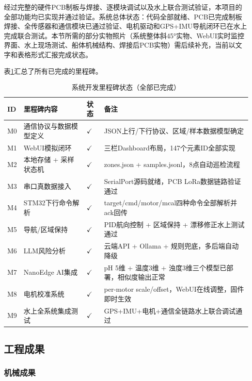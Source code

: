 \documentclass[12pt,a4paper]{ctexart}
\begin{document}
经过完整的硬件PCB制板与焊接、逐模块调试以及水上联合测试验证，本项目的全部功能均已实现并通过验证。系统总体状态：代码全部就绪、PCB已完成制板焊接、全传感器和通信模块已通过验证、电机驱动和GPS+IMU导航闭环已在水上完成联合测试。本节所需的部分实物照片（系统整体斜45°实物、WebUI实时监控界面、水上现场测试、船体机械结构、焊接后PCB实物）需后续补充，当前以文字和表格形式汇报完成状态。

表\ref{tab:milestones}汇总了所有已完成的里程碑。

\begin{table}[H]
\centering
\caption{系统开发里程碑状态（全部已完成）}
\label{tab:milestones}
\begin{tabular}{p{0.8cm}p{5.5cm}p{2cm}p{4.5cm}}
\toprule
\textbf{ID} & \textbf{里程碑内容} & \textbf{状态} & \textbf{备注} \\
\midrule
M0 & 通信协议与数据模型定义 & $\checkmark$ & JSON上行/下行协议、区域/样本数据模型确定 \\
M1 & WebUI模拟闭环 & $\checkmark$ & 三栏Dashboard布局，147个元素ID全部实现 \\
M2 & 本地存储 + 采样状态机 & $\checkmark$ & zones.json + samples.jsonl，8点自动巡检流程 \\
M3 & 串口真数据接入 & $\checkmark$ & SerialPort源码就绪，PCB LoRa数据链路验证通过 \\
M4 & STM32下行命令解析 & $\checkmark$ & target/cmd/motor/mcal四种命令全部解析并ack回传 \\
M5 & 导航/区域保持 & $\checkmark$ & PID航向控制 + 区域保持 + 漂移修正水上测试通过 \\
M6 & LLM风险分析 & $\checkmark$ & 云端API + Ollama + 规则兜底，多后端自动降级 \\
M7 & NanoEdge AI集成 & $\checkmark$ & pH 5维 + 温度3维 + 浊度3维三个模型已部署，相似度输出正常 \\
M8 & 电机校准系统 & $\checkmark$ & per-motor scale/offset，WebUI在线调整，固件即时生效 \\
M9 & 水上全系统集成测试 & $\checkmark$ & GPS+IMU+电机+通信全链路水上联合调试通过 \\
\bottomrule
\end{tabular}
\end{table}

\subsection{工程成果}

\subsubsection{机械成果}
\end{document}
